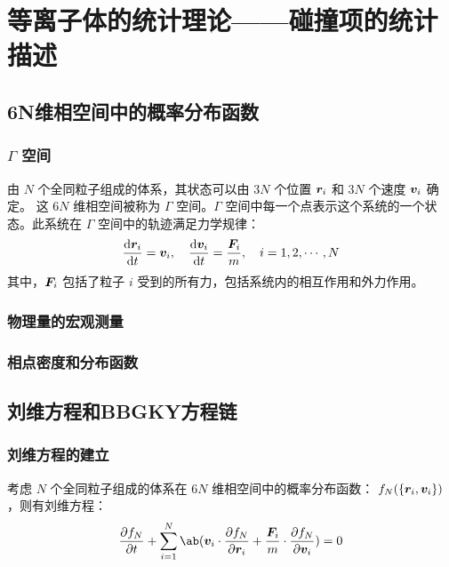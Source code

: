 
\chapter{等离子体的统计理论——碰撞项的统计描述}

\section{6N维相空间中的概率分布函数}

\subsection{\texorpdfstring{$\Gamma$}{Gamma} 空间}

由 $N$ 个全同粒子组成的体系，其状态可以由 $3N$ 个位置 $\bm{r}_i$ 和 $3N$ 个速度 $\bm{v}_i$ 确定。
这 $6N$ 维相空间被称为 $\Gamma$ 空间。$\Gamma$ 空间中每一个点表示这个系统的一个状态。此系统在 $\Gamma$ 空间中的轨迹满足力学规律：
\begin{equation}
\odv{\vector{r}_i}{t} = \vector{v}_i,
\quad \odv{\vector{v}_i}{t} = \frac{\vector{F}_i}{m},
\quad i = 1, 2, \cdots, N
\end{equation}
其中，$\bm{F}_i$ 包括了粒子 $i$ 受到的所有力，包括系统内的相互作用和外力作用。

\subsection{物理量的宏观测量}

\subsection{相点密度和分布函数}

\section{刘维方程和BBGKY方程链}

\subsection{刘维方程的建立}

考虑 $N$ 个全同粒子组成的体系在 $6N$ 维相空间中的概率分布函数：
$f_N(\{\bm{r}_i, \bm{v}_i\})$，则有刘维方程：
\begin{equation}
\pdv{f_N}{t} + \sum_{i=1}^N \ab(
    \vector{v}_i \cdot \pdv{f_N}{\vector{r}_i}
    + \frac{\vector{F}_i}{m} \cdot \pdv{f_N}{\vector{v}_i}
) = 0
\end{equation}

